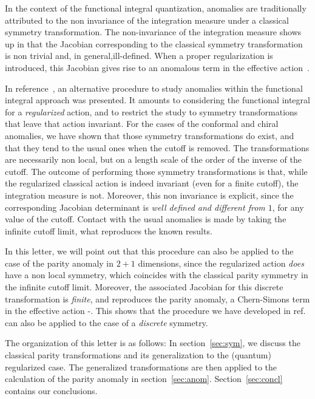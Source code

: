 \documentclass[a4paper,12pt]{article}
\begin{document}
In the context of the functional integral quantization, anomalies are
traditionally attributed to the non invariance of the integration
measure under a classical symmetry transformation. The non-invariance
of the integration measure shows up in that the Jacobian corresponding
to the classical symmetry transformation is non trivial and, in 
general,ill-defined. When a proper regularization is introduced,
this Jacobian gives rise to an anomalous term
in the effective action~\cite{Fujikawa}.

In reference~\cite{fm}, an alternative procedure to study anomalies
within the functional integral approach was presented. It amounts to
considering the functional integral for a {\em regularized\/}
action, and to restrict the study to symmetry transformations that
leave that action invariant.  For the cases of the conformal and
chiral anomalies, we have shown that those symmetry transformations do
exist, and that they tend to the usual ones when the cutoff is
removed. The transformations are necessarily non local, but on a
length scale of the order of the inverse of the cutoff.  The outcome
of performing those symmetry transformations is that, while the
regularized classical action is indeed invariant (even for a finite
cutoff), the integration measure is not. Moreover, this non invariance
is explicit, since the corresponding Jacobian determinant is {\em well
  defined and different from $1$}, for any value of the cutoff.
Contact with the usual anomalies is made by taking the infinite cutoff
limit, what reproduces the known results.

In this letter, we will point out that this procedure can also be
applied to the case of the parity anomaly in $2+1$ dimensions, since
the regularized action {\it does\/} have a non local symmetry, which
coincides with the classical parity symmetry in the infinite cutoff limit.
Moreover, the associated Jacobian for this discrete transformation is
{\em finite}, and reproduces the parity anomaly, a Chern-Simons term in the
effective action
\cite{DeserJT}-\cite{RedlichL}. 
This shows that the procedure we have developed in
ref.~\cite{fm} can also be applied to the case of a {\em discrete\/}
symmetry.

The organization of this letter is as follows: In
section~\ref{sec:sym}, we discuss the classical parity transformations
and its generalization to the (quantum) regularized case. The
generalized transformations are then applied to the calculation of the
parity anomaly in section~\ref{sec:anom}.  Section~\ref{sec:concl}
contains our conclusions.
\end{document}

